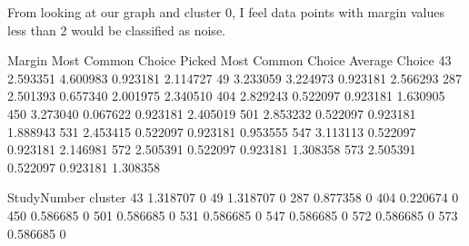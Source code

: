 \documentclass[letterpaper,10pt,english]{jupyterBook}
\begin{document}
\sphinxAtStartPar
From looking at our graph and cluster 0, I feel data points with margin values less than \sphinxhyphen{}2 would be classified as noise.

\begin{sphinxVerbatim}[commandchars=\\\{\}]
  \PYG{p}{[}  \PYG{p}{]}
\end{sphinxVerbatim}

\begin{sphinxVerbatim}[commandchars=\\\{\}]
       Margin  Most Common Choice Picked  Most Common Choice  Average Choice  \PYGZbs{}
43  \PYGZhy{}2.593351                   4.600983           \PYGZhy{}0.923181       \PYGZhy{}2.114727   
49  \PYGZhy{}3.233059                   3.224973           \PYGZhy{}0.923181       \PYGZhy{}2.566293   
287 \PYGZhy{}2.501393                  \PYGZhy{}0.657340           \PYGZhy{}2.001975       \PYGZhy{}2.340510   
404 \PYGZhy{}2.829243                   0.522097           \PYGZhy{}0.923181       \PYGZhy{}1.630905   
450 \PYGZhy{}3.273040                  \PYGZhy{}0.067622           \PYGZhy{}0.923181       \PYGZhy{}2.405019   
501 \PYGZhy{}2.853232                   0.522097           \PYGZhy{}0.923181       \PYGZhy{}1.888943   
531 \PYGZhy{}2.453415                   0.522097           \PYGZhy{}0.923181       \PYGZhy{}0.953555   
547 \PYGZhy{}3.113113                   0.522097           \PYGZhy{}0.923181       \PYGZhy{}2.146981   
572 \PYGZhy{}2.505391                   0.522097           \PYGZhy{}0.923181       \PYGZhy{}1.308358   
573 \PYGZhy{}2.505391                   0.522097           \PYGZhy{}0.923181       \PYGZhy{}1.308358   

     StudyNumber  cluster  
43      1.318707        0  
49      1.318707        0  
287    \PYGZhy{}0.877358        0  
404     0.220674        0  
450     0.586685        0  
501     0.586685        0  
531     0.586685        0  
547     0.586685        0  
572     0.586685        0  
573     0.586685        0  
\end{sphinxVerbatim}

\begin{sphinxVerbatim}[commandchars=\\\{\}]
  
\end{sphinxVerbatim}
\end{document}
